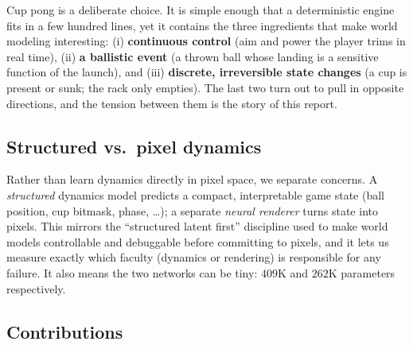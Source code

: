 \documentclass[11pt]{article}
\begin{document}
Cup pong is a deliberate choice. It is simple enough that a deterministic engine fits in a few hundred lines, yet it contains the three ingredients that make world modeling interesting: (i) \textbf{continuous control} (aim and power the player trims in real time), (ii) \textbf{a ballistic event} (a thrown ball whose landing is a sensitive function of the launch), and (iii) \textbf{discrete, irreversible state changes} (a cup is present or sunk; the rack only empties). The last two turn out to pull in opposite directions, and the tension between them is the story of this report.

\subsection{Structured vs.\ pixel dynamics}

Rather than learn dynamics directly in pixel space, we separate concerns. A \emph{structured} dynamics model predicts a compact, interpretable game state (ball position, cup bitmask, phase, \ldots); a separate \emph{neural renderer} turns state into pixels. This mirrors the ``structured latent first'' discipline used to make world models controllable and debuggable before committing to pixels, and it lets us measure exactly which faculty (dynamics or rendering) is responsible for any failure. It also means the two networks can be tiny: $409$K and $262$K parameters respectively.

\subsection{Contributions}
\end{document}
